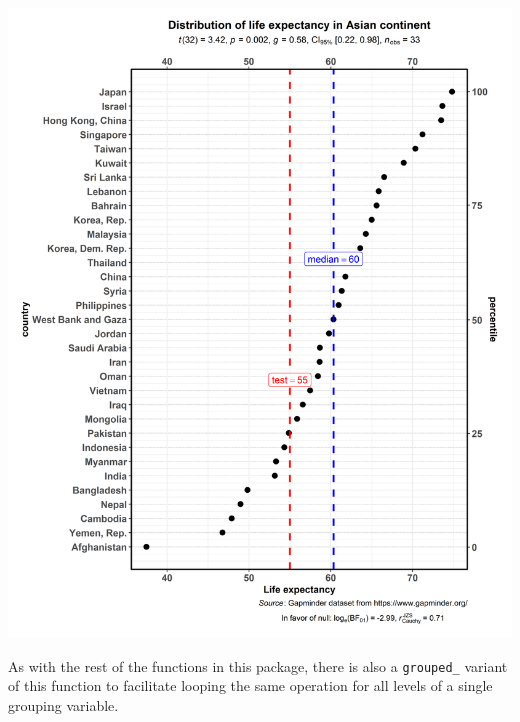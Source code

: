 \documentclass[]{article}
\begin{document}
\includegraphics[width=1\linewidth]{./figures/paper-ggdotplotstats1-1}

As with the rest of the functions in this package, there is also a \texttt{grouped\_}
variant of this function to facilitate looping the same operation for all levels
of a single grouping variable.
\end{document}
